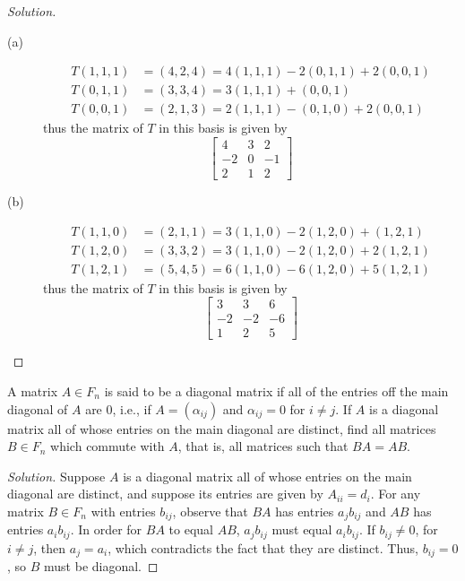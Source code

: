 \documentclass[12pt,leqno]{article}
\numberwithin{equation}{section}
\newcommand{\question}[2] {\vspace{.25in} \noindent\fbox{#1} #2 \vspace{.10in}}
\theoremstyle{definition}
\begin{document}
\begin{proof}[Solution]
 \begin{description}
  \item [(a)] \begin{align*}T(1,1,1)&=(4,2,4)=4(1,1,1)-2(0,1,1)+2(0,0,1)\\T(0,1,1)&=(3,3,4)=3(1,1,1)+(0,0,1)\\T(0,0,1)&=(2,1,3)=2(1,1,1)-(0,1,0)+2(0,0,1)\end{align*} thus the matrix of $T$ in this basis is given by \[\begin{bmatrix}4&3&2\\-2&0&-1\\2&1&2\end{bmatrix}\]
  \item [(b)] \begin{align*}T(1,1,0)&=(2,1,1)=3(1,1,0)-2(1,2,0)+(1,2,1)\\T(1,2,0)&=(3,3,2)=3(1,1,0)-2(1,2,0)+2(1,2,1)\\T(1,2,1)&=(5,4,5)=6(1,1,0)-6(1,2,0)+5(1,2,1)\end{align*} thus the matrix of $T$ in this basis is given by \[\begin{bmatrix}3&3&6\\-2&-2&-6\\1&2&5\end{bmatrix}\]
 \end{description}

\end{proof}

\question{9}{A matrix $A\in F_n$ is said to be a diagonal matrix if all of the entries off the main diagonal of $A$ are 0, i.e., if $A=(\alpha_{ij})$ and $\alpha_{ij}=0$ for $i\not=j$. If $A$ is a diagonal matrix all of whose entries on the main diagonal are distinct, find all matrices $B\in F_n$ which commute with $A$, that is, all matrices such that $BA=AB$.}

\begin{proof}[Solution]
 Suppose $A$ is a diagonal matrix all of whose entries on the main diagonal are distinct, and suppose its entries are given by $A_{ii}=d_i$. For any matrix $B\in F_n$ with entries $b_{ij}$, observe that $BA$ has entries $a_jb_{ij}$ and $AB$ has entries $a_ib_{ij}$. In order for $BA$ to equal $AB$, $a_jb_{ij}$ must equal $a_ib_{ij}$. If $b_{ij}\not=0$, for $i\not=j$, then $a_j=a_i$, which contradicts the fact that they are distinct. Thus, $b_{ij}=0$, so $B$ must be diagonal.
\end{proof}
\end{document}
